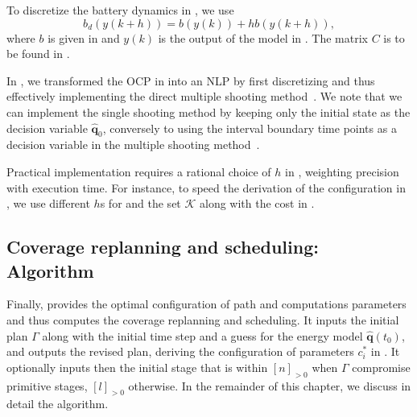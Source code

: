 To discretize the battery dynamics in , we use
\begin{equation}\label{eq:batt-euler}
  b_d(y(k+h))=b(y(k))+hb(y(k+h)),
\end{equation}
where $b$ is given in  and $y(k)$ is the output of the model in . The matrix $C$ is to be found in .

In , we transformed the OCP in  into an NLP by first discretizing and thus effectively implementing the direct multiple shooting method~\citep{rawlings2017model}. We note that we can implement the single shooting method by keeping only the initial state as the decision variable $\hat{\mathbf{q}}_0$, conversely to using the interval boundary time points as a decision variable in the multiple shooting method~\citep{rawlings2017model}.

Practical implementation requires a rational choice of $h$ in , weighting precision with execution time. For instance, to speed the derivation of the configuration in , we use different $h$s for  and the set $\mathcal{K}$ along with the cost in .

\subsection{Coverage replanning and scheduling: Algorithm}
\label{sec:algo}

Finally,  provides the optimal configuration of path and computations parameters and thus computes the coverage replanning and scheduling. It inputs the initial plan $\Gamma$ along with the initial time step and a guess for the energy model $\hat{\mathbf{q}}(t_0)$, and outputs the revised plan, deriving the configuration of parameters $c_i^*$ in . It optionally inputs then the initial stage that is within $[n]_{>0}$ when $\Gamma$ compromise primitive stages, $[l]_{>0}$ otherwise. In the remainder of this chapter, we discuss in detail the algorithm.

